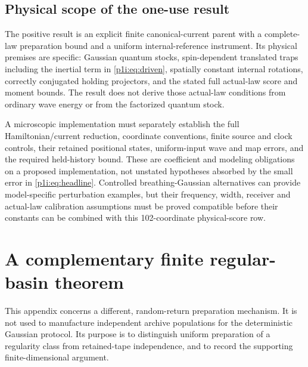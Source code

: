 \documentclass[11pt]{article}
\numberwithin{equation}{section}
\theoremstyle{definition}
\theoremstyle{remark}
\begin{document}
\subsection{Physical scope of the one-use result}

The positive result is an explicit finite canonical-current parent with
a complete-law preparation bound and a uniform internal-reference
instrument. Its physical premises are specific: Gaussian quantum
stocks, spin-dependent translated traps including the inertial term in
\eqref{p1i:eq:driven}, spatially constant internal rotations, correctly
conjugated holding projectors, and the stated full actual-law score and
moment bounds. The result does not derive those actual-law conditions
from ordinary wave energy or from the factorized quantum stock.

A microscopic implementation must separately establish the full
Hamiltonian/current reduction, coordinate conventions, finite source
and clock controls, their retained positional states, uniform-input
wave and map errors, and the required held-history bound. These are
coefficient and modeling obligations on a proposed implementation, not
unstated hypotheses absorbed by the small error in
\eqref{p1i:eq:headline}. Controlled breathing-Gaussian alternatives can
provide model-specific perturbation examples, but their frequency,
width, receiver and actual-law calibration assumptions must be proved
compatible before their constants can be combined with this
102-coordinate physical-score row.

\appendix
\section{A complementary finite regular-basin theorem}\label{app:regular}
This appendix concerns a different, random-return preparation mechanism. It is not used to manufacture independent archive populations for the deterministic Gaussian protocol. Its purpose is to distinguish uniform preparation of a regularity class from retained-tape independence, and to record the supporting finite-dimensional argument.
\end{document}
